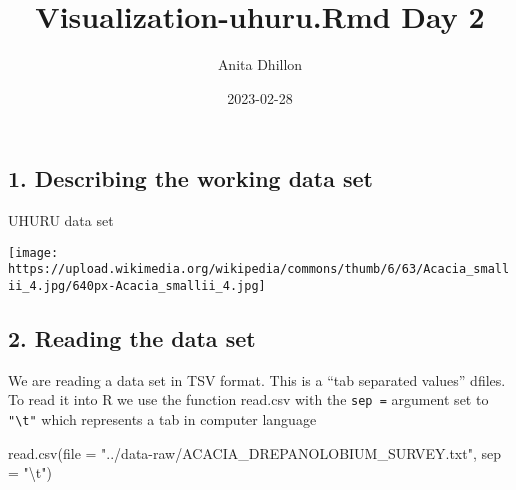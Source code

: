 \documentclass[
]{article}
\title{Visualization-uhuru.Rmd Day 2}
\author{Anita Dhillon}
\date{2023-02-28}
\newenvironment{Shaded}{\begin{snugshade}}{\end{snugshade}}
\newcommand{\AttributeTok}[1]{\textcolor[rgb]{0.77,0.63,0.00}{#1}}
\newcommand{\FunctionTok}[1]{\textcolor[rgb]{0.00,0.00,0.00}{#1}}
\newcommand{\NormalTok}[1]{#1}
\newcommand{\SpecialCharTok}[1]{\textcolor[rgb]{0.00,0.00,0.00}{#1}}
\newcommand{\StringTok}[1]{\textcolor[rgb]{0.31,0.60,0.02}{#1}}
\begin{document}
\maketitle

\hypertarget{describing-the-working-data-set}{%
\subsection{1. Describing the working data
set}\label{describing-the-working-data-set}}

UHURU data set

\texttt{[image: https://upload.wikimedia.org/wikipedia/commons/thumb/6/63/Acacia\_smallii\_4.jpg/640px-Acacia\_smallii\_4.jpg]}

\hypertarget{reading-the-data-set}{%
\subsection{2. Reading the data set}\label{reading-the-data-set}}

We are reading a data set in TSV format. This is a ``tab separated
values'' dfiles. To read it into R we use the function read.csv with the
\texttt{sep\ =} argument set to \texttt{"\textbackslash{}t"} which
represents a tab in computer language

\begin{Shaded}
\begin{Highlighting}[]
 \FunctionTok{read.csv}\NormalTok{(}\AttributeTok{file =} \StringTok{"../data{-}raw/ACACIA\_DREPANOLOBIUM\_SURVEY.txt"}\NormalTok{, }\AttributeTok{sep =} \StringTok{"}\SpecialCharTok{\textbackslash{}t}\StringTok{"}\NormalTok{)}
\end{Highlighting}
\end{Shaded}
\end{document}
